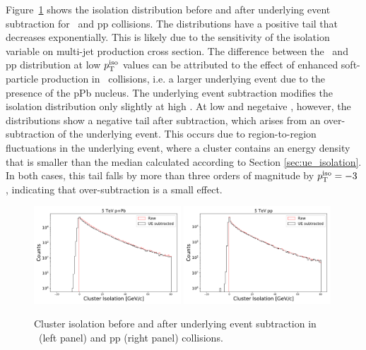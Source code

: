 Figure~\ref{fig:iso_ue} shows the isolation distribution before and after underlying event subtraction for \pPb~and pp collisions. The distributions have a positive tail that decreases exponentially. This is likely due to the sensitivity of the isolation variable on multi-jet production cross section. The difference between the \pPb~and pp distribution at low $p_{\mathrm{T}}^\mathrm{iso}$ values can be attributed to the effect of enhanced soft-particle production in \pPb~collisions, i.e. a larger underlying event due to the presence of the pPb nucleus. The underlying event subtraction modifies the isolation distribution only slightly at high \pt. At low and negetaive \pt, however, the distributions show a negative tail after subtraction, which arises from an over-subtraction of the underlying event. This occurs due to region-to-region fluctuations in the underlying event, where a cluster contains an energy density that is smaller than the median calculated according to Section \ref{sec:ue_isolation}. In both cases, this tail falls by more than three orders of magnitude by $p_{\mathrm{T}}^\mathrm{iso}=-3$ \GeVc, indicating that over-subtraction is a small effect.   

\begin{figure}[h]
\center
\includegraphics[width=0.49\textwidth]{Data_Analysis/Isolation/IsolationWithUESubtraction_Skimmed_13def_root}
\includegraphics[width=0.49\textwidth]{Data_Analysis/Isolation/IsolationWithUESubtraction_Skimmed_17q_root}
\caption{Cluster isolation before and after underlying event subtraction in \pPb~(left panel) and pp (right panel) collisions.}
\label{fig:iso_ue}
\end{figure}

